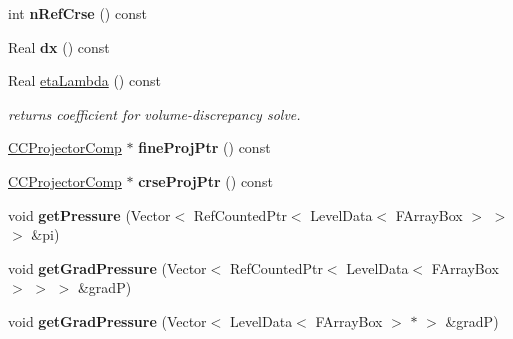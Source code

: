 \begin{DoxyCompactItemize}
\item 
\hypertarget{class_c_c_projector_comp_a703cd5186f66a02791cc1a1923ed3dc4}{int {\bfseries n\-Ref\-Crse} () const }\label{class_c_c_projector_comp_a703cd5186f66a02791cc1a1923ed3dc4}

\item 
\hypertarget{class_c_c_projector_comp_a3c46f0f4b39a00e21919f30af420ef0c}{Real {\bfseries dx} () const }\label{class_c_c_projector_comp_a3c46f0f4b39a00e21919f30af420ef0c}

\item 
\hypertarget{class_c_c_projector_comp_adcae619862e5aab75bf1ec5eb27b3f29}{Real \hyperlink{class_c_c_projector_comp_adcae619862e5aab75bf1ec5eb27b3f29}{eta\-Lambda} () const }\label{class_c_c_projector_comp_adcae619862e5aab75bf1ec5eb27b3f29}

\begin{DoxyCompactList}\small\item\em returns coefficient for volume-\/discrepancy solve. \end{DoxyCompactList}\item 
\hypertarget{class_c_c_projector_comp_a91943665b65efffe9a202c53f7ea509d}{\hyperlink{class_c_c_projector_comp}{C\-C\-Projector\-Comp} $\ast$ {\bfseries fine\-Proj\-Ptr} () const }\label{class_c_c_projector_comp_a91943665b65efffe9a202c53f7ea509d}

\item 
\hypertarget{class_c_c_projector_comp_abf1f909be93a8424238673c270f02cbf}{\hyperlink{class_c_c_projector_comp}{C\-C\-Projector\-Comp} $\ast$ {\bfseries crse\-Proj\-Ptr} () const }\label{class_c_c_projector_comp_abf1f909be93a8424238673c270f02cbf}

\item 
\hypertarget{class_c_c_projector_comp_a850294166eb6e6650308671d802fb8c8}{void {\bfseries get\-Pressure} (Vector$<$ Ref\-Counted\-Ptr$<$ Level\-Data$<$ F\-Array\-Box $>$ $>$ $>$ \&pi)}\label{class_c_c_projector_comp_a850294166eb6e6650308671d802fb8c8}

\item 
\hypertarget{class_c_c_projector_comp_ae0311417cf36f110c95c9d071f0d15b3}{void {\bfseries get\-Grad\-Pressure} (Vector$<$ Ref\-Counted\-Ptr$<$ Level\-Data$<$ F\-Array\-Box $>$ $>$ $>$ \&grad\-P)}\label{class_c_c_projector_comp_ae0311417cf36f110c95c9d071f0d15b3}

\item 
\hypertarget{class_c_c_projector_comp_a98e40dac22995c915a0ad5a03af4efde}{void {\bfseries get\-Grad\-Pressure} (Vector$<$ Level\-Data$<$ F\-Array\-Box $>$ $\ast$ $>$ \&grad\-P)}\label{class_c_c_projector_comp_a98e40dac22995c915a0ad5a03af4efde}


\end{DoxyCompactItemize}
